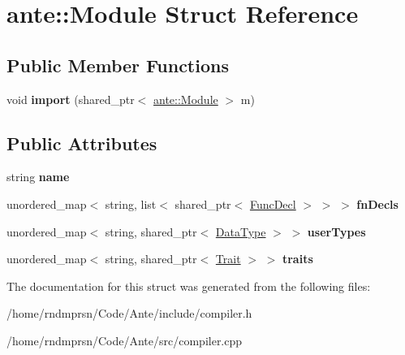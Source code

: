 \hypertarget{structante_1_1Module}{}\section{ante\+:\+:Module Struct Reference}
\label{structante_1_1Module}
\subsection*{Public Member Functions}
\begin{DoxyCompactItemize}
\item 
\mbox{\label{structante_1_1Module_aed4991069d849a1d69234d4c42c26fe9}} 
void {\bfseries import} (shared\+\_\+ptr$<$ \hyperlink{structante_1_1Module}{ante\+::\+Module} $>$ m)
\end{DoxyCompactItemize}
\subsection*{Public Attributes}
\begin{DoxyCompactItemize}
\item 
\mbox{\label{structante_1_1Module_a36e60682c6116681e267643366cd30dd}} 
string {\bfseries name}
\item 
\mbox{\label{structante_1_1Module_a2ab5014305aef42defe08c27ae31d34d}} 
unordered\+\_\+map$<$ string, list$<$ shared\+\_\+ptr$<$ \hyperlink{structFuncDecl}{Func\+Decl} $>$ $>$ $>$ {\bfseries fn\+Decls}
\item 
\mbox{\label{structante_1_1Module_aac3d45722c28295f9edbac8f99652d59}} 
unordered\+\_\+map$<$ string, shared\+\_\+ptr$<$ \hyperlink{structDataType}{Data\+Type} $>$ $>$ {\bfseries user\+Types}
\item 
\mbox{\label{structante_1_1Module_a15e6b1a8b67a18cfcb1bbbddc8f5a3ff}} 
unordered\+\_\+map$<$ string, shared\+\_\+ptr$<$ \hyperlink{structTrait}{Trait} $>$ $>$ {\bfseries traits}
\end{DoxyCompactItemize}


The documentation for this struct was generated from the following files\+:\begin{DoxyCompactItemize}
\item 
/home/rndmprsn/\+Code/\+Ante/include/compiler.\+h\item 
/home/rndmprsn/\+Code/\+Ante/src/compiler.\+cpp\end{DoxyCompactItemize}
